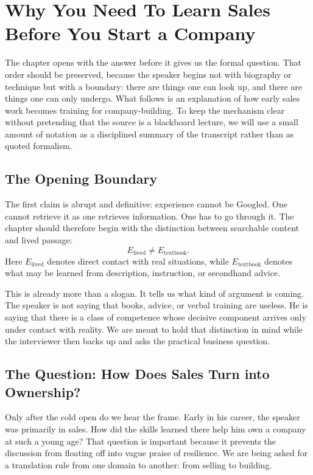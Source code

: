 \chapter{Why You Need To Learn Sales Before You Start a Company}

The chapter opens with the answer before it gives us the formal question. That order should be preserved, because the speaker begins not with biography or technique but with a boundary: there are things one can look up, and there are things one can only undergo. What follows is an explanation of how early sales work becomes training for company-building. To keep the mechanism clear without pretending that the source is a blackboard lecture, we will use a small amount of notation as a disciplined summary of the transcript rather than as quoted formalism.

\section{The Opening Boundary}

The first claim is abrupt and definitive: experience cannot be Googled. One cannot retrieve it as one retrieves information. One has to go through it. The chapter should therefore begin with the distinction between searchable content and lived passage:
\begin{equation}
E_{\mathrm{lived}} \neq E_{\mathrm{textbook}}.
\end{equation}
Here \(E_{\mathrm{lived}}\) denotes direct contact with real situations, while \(E_{\mathrm{textbook}}\) denotes what may be learned from description, instruction, or secondhand advice.

This is already more than a slogan. It tells us what kind of argument is coming. The speaker is not saying that books, advice, or verbal training are useless. He is saying that there is a class of competence whose decisive component arrives only under contact with reality. We are meant to hold that distinction in mind while the interviewer then backs up and asks the practical business question.

\section{The Question: How Does Sales Turn into Ownership?}

Only after the cold open do we hear the frame. Early in his career, the speaker was primarily in sales. How did the skills learned there help him own a company at such a young age? That question is important because it prevents the discussion from floating off into vague praise of resilience. We are being asked for a translation rule from one domain to another: from selling to building.


